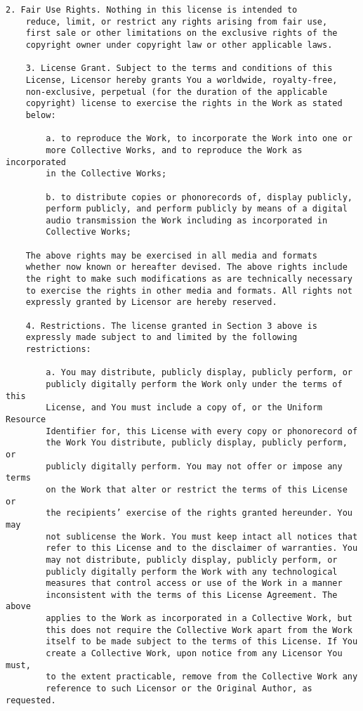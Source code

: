 \begin{Verbatim}[fontsize=\footnotesize]
    2. Fair Use Rights. Nothing in this license is intended to
    reduce, limit, or restrict any rights arising from fair use,
    first sale or other limitations on the exclusive rights of the
    copyright owner under copyright law or other applicable laws.
    
    3. License Grant. Subject to the terms and conditions of this
    License, Licensor hereby grants You a worldwide, royalty-free,
    non-exclusive, perpetual (for the duration of the applicable
    copyright) license to exercise the rights in the Work as stated
    below:
    
        a. to reproduce the Work, to incorporate the Work into one or
        more Collective Works, and to reproduce the Work as incorporated
        in the Collective Works;
        
        b. to distribute copies or phonorecords of, display publicly,
        perform publicly, and perform publicly by means of a digital
        audio transmission the Work including as incorporated in
        Collective Works;
    
    The above rights may be exercised in all media and formats
    whether now known or hereafter devised. The above rights include
    the right to make such modifications as are technically necessary
    to exercise the rights in other media and formats. All rights not
    expressly granted by Licensor are hereby reserved.
    
    4. Restrictions. The license granted in Section 3 above is
    expressly made subject to and limited by the following
    restrictions:
    
        a. You may distribute, publicly display, publicly perform, or
        publicly digitally perform the Work only under the terms of this
        License, and You must include a copy of, or the Uniform Resource
        Identifier for, this License with every copy or phonorecord of
        the Work You distribute, publicly display, publicly perform, or
        publicly digitally perform. You may not offer or impose any terms
        on the Work that alter or restrict the terms of this License or
        the recipients’ exercise of the rights granted hereunder. You may
        not sublicense the Work. You must keep intact all notices that
        refer to this License and to the disclaimer of warranties. You
        may not distribute, publicly display, publicly perform, or
        publicly digitally perform the Work with any technological
        measures that control access or use of the Work in a manner
        inconsistent with the terms of this License Agreement. The above
        applies to the Work as incorporated in a Collective Work, but
        this does not require the Collective Work apart from the Work
        itself to be made subject to the terms of this License. If You
        create a Collective Work, upon notice from any Licensor You must,
        to the extent practicable, remove from the Collective Work any
        reference to such Licensor or the Original Author, as requested.
        

\end{Verbatim}
